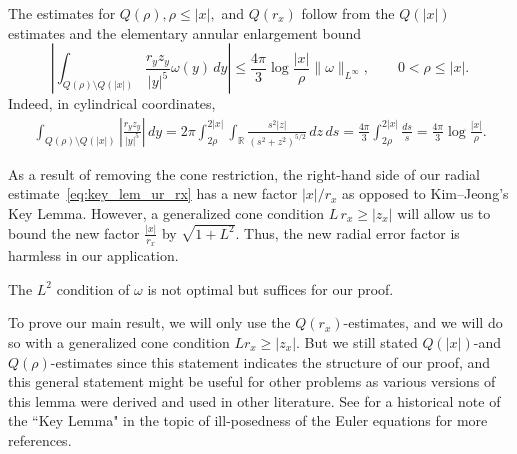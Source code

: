 \documentclass[reqno,11pt]{amsart}
\begin{document}
The estimates for $Q(\rho), \rho \leq |x|,$ and $Q(r_x)$ follow from the $Q(|x|)$ estimates and the elementary annular enlargement bound
\[
\left|
\int_{Q(\rho)\setminus Q(|x|)}
\frac{r_yz_y}{|y|^5}\omega(y)\,dy
\right|
\le
\frac{4\pi}{3}\log\frac{|x|}{\rho}\|\omega\|_{L^\infty},
\qquad 0<\rho\le |x|.
\]
Indeed, in cylindrical coordinates, 
\begin{align}
\label{eq:ele_bd}
\int_{Q(\rho)\setminus Q(|x|)}
\left|\frac{r_yz_y}{|y|^5}\right|\,dy
=2\pi
\int_{2\rho}^{2|x|}
\int_{\mathbb R}
\frac{s^2|z|}{(s^2+z^2)^{5/2}}\,dz\,ds
=\frac{4\pi}{3}
\int_{2\rho}^{2|x|}\frac{ds}{s}
=\frac{4\pi}{3}
\log\frac{|x|}{\rho}.
\end{align}





As a result of removing the cone restriction, the right-hand side of our radial estimate~\eqref{eq:key_lem_ur_rx} has a new factor $|x|/r_x$ as opposed to Kim--Jeong's Key Lemma.
However, a generalized cone condition $L\, r_x \geq |z_x|$ will allow us to bound the new factor $\frac{|x|}{r_x} $ by $\sqrt{1+L^2}$. Thus, the new radial error factor is harmless in our application. 

The $L^2$ condition of $\omega$ is not optimal but suffices for our proof.

To prove our main result, we will only use the $Q(r_x)$-estimates, and we will do so with a generalized cone condition $Lr_x\geq |z_x|$. But we still stated $Q(|x|)$-and $Q(\rho)$-estimates since this statement indicates the structure of our proof, and this general statement might be useful for other problems as various versions of this lemma were derived and used in other literature.
 See \cite[Page~6]{KimJeong22} for a historical note of the ``Key Lemma" in the topic of ill-posedness of the Euler equations for more references.
\end{document}
